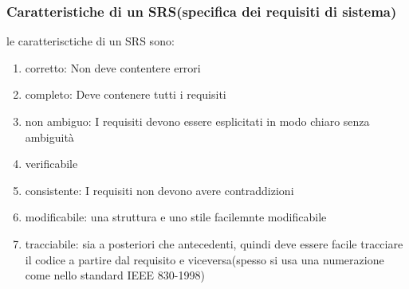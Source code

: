 \subsubsection{Caratteristiche di un SRS(specifica dei requisiti di sistema)}
le caratterisctiche di un SRS sono:
\begin{enumerate}
    \item corretto: Non deve contentere errori
    \item completo: Deve contenere tutti i requisiti
    \item non ambiguo: I requisiti devono essere esplicitati in modo chiaro senza ambiguit\`a
    \item verificabile 
    \item consistente: I requisiti non devono avere contraddizioni
    \item modificabile: una struttura e uno stile facilemnte modificabile
    \item tracciabile: sia a posteriori che antecedenti, quindi deve essere facile tracciare il codice
            a partire dal requisito e viceversa(spesso si usa una numerazione come nello standard IEEE 830-1998)
\end{enumerate}
